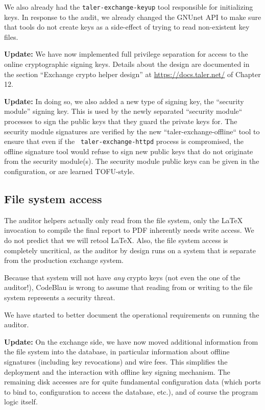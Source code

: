 \documentclass[11pt]{article}
\begin{document}
We also already had the {\tt taler-exchange-keyup} tool responsible for
initializing keys. In response to the audit, we already changed the GNUnet API
to make sure that tools do not create keys as a side-effect of trying to read
non-existent key files.

{\bf Update:} We have now implemented full privilege separation for access to the online
cryptographic signing keys.  Details about the design are documented in the
section ``Exchange crypto helper design'' at \url{https://docs.taler.net/} of
Chapter 12.

{\bf Update:} In doing so, we also added a new type of signing key, the
``security module'' signing key. This is used by the newly separated ``security
module`` processes to sign the public keys that they guard the private keys
for. The security module signatures are verified by the new
``taler-exchange-offline`` tool to ensure that even if the {\tt
taler-exchange-httpd} process is compromised, the offline signature tool would
refuse to sign new public keys that do not originate from the security
module(s).  The security module public keys can be given in the configuration,
or are learned TOFU-style.


\subsection{File system access}

The auditor helpers actually only read from the file system, only the LaTeX
invocation to compile the final report to PDF inherently needs write
access. We do not predict that we will retool LaTeX.  Also, the file system
access is completely uncritical, as the auditor by design runs on a system
that is separate from the production exchange system.

Because that system will not have {\em any} crypto keys (not even the one of
the auditor!), CodeBlau is wrong to assume that reading from or writing to the
file system represents a security threat.

We have started to better document the operational requirements on running the
auditor.

{\bf Update:} On the exchange side, we have now moved additional information
from the file system into the database, in particular information about offline signatures
(including key revocations) and wire fees.  This simplifies the deployment and
the interaction with offline key signing mechanism.  The remaining disk accesses are for
quite fundamental configuration data (which ports to bind to, configuration to
access the database, etc.), and of course the program logic itself.
\end{document}
